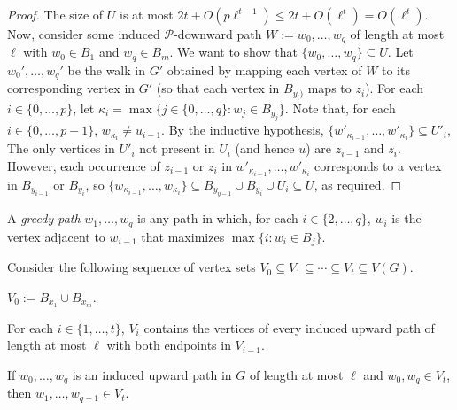 \documentclass[kpfonts]{patmorin}
\theoremstyle{named}
\begin{document}
\begin{proof}
    The size of $U$ is at most $2t+O(p\ell^{t-1})\le 2t+O(\ell^{t})=O(\ell^{t})$.  Now, consider some induced $\mathcal{P}$-downward path $W:=w_0,\ldots,w_q$ of length at most $\ell$ with $w_0\in B_1$ and $w_q\in B_m$.  We want to show that $\{w_0,\ldots,w_q\}\subseteq U$.  Let $w_0',\ldots,w_q'$ be the walk in $G'$ obtained by mapping each vertex of $W$ to its corresponding vertex in $G'$ (so that each vertex in $B_{y_i)}$ maps to $z_i$).  For each $i\in\{0,\ldots,p\}$, let $\kappa_i=\max\{j\in\{0,\ldots,q\}:w_j\in B_{y_j}\}$.  Note that, for each $i\in\{0,\ldots,p-1\}$, $w_{\kappa_i}\neq u_{i-1}$.  By the inductive hypothesis, $\{w'_{\kappa_{i-1}},\ldots,w'_{\kappa_{i}}\}\subseteq U'_i$,  The only vertices in $U'_i$ not present in $U_i$ (and hence $u$) are $z_{i-1}$ and $z_i$.  However, each occurrence of $z_{i-1}$ or $z_i$ in $w'_{\kappa_{i-1}},\ldots,w'_{\kappa_{i}}$ corresponds to a vertex in $B_{y_{i-1}}$ or $B_{y_i}$, so $\{w_{\kappa_{i-1}},\ldots,w_{\kappa_i}\}\subseteq B_{y_{y-1}}\cup B_{y_i}\cup U_i\subseteq U$, as required.
\end{proof}


A \emph{greedy path} $w_1,\ldots,w_q$ is any path in which, for each $i\in\{2,\ldots,q\}$, $w_i$ is the vertex adjacent to $w_{i-1}$ that maximizes $\max\{i:w_i\in B_j\}$.



Consider the following sequence of vertex sets $V_0\subseteq V_1\subseteq\cdots\subseteq V_t\subseteq V(G)$.
\begin{compactenum}
    \item $V_0:= B_{x_1}\cup B_{x_m}$.
    \item For each $i\in\{1,\ldots,t\}$, $V_i$ contains the vertices of every induced upward path of length at most $\ell$ with both endpoints in $V_{i-1}$.
\end{compactenum}

\begin{lem}
    If $w_0,\ldots,w_q$ is an induced upward path in $G$ of length at most $\ell$ and $w_0,w_q\in V_t$, then $w_1,\ldots,w_{q-1}\in V_t$.
\end{lem}
\end{document}
